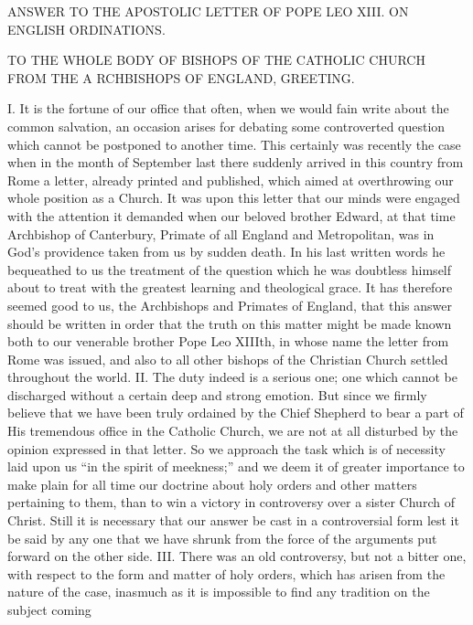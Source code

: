ANSWER TO THE APOSTOLIC LETTER OF POPE LEO XIII. ON ENGLISH ORDINATIONS.

TO THE WHOLE BODY OF BISHOPS OF THE CATHOLIC CHURCH FROM THE A RCHBISHOPS OF ENGLAND, GREETING.

I. It is the fortune of our office that often, when we would fain write about the common salvation, an occasion arises for debating some controverted question which cannot be postponed to another time. This certainly was recently the case when in the month of September last there suddenly arrived in this country from Rome a letter, already printed and published, which aimed at overthrowing our whole position as a Church. It was upon this letter that our minds were engaged with the attention it demanded when our beloved brother Edward, at that time Archbishop of Canterbury, Primate of all England and Metropolitan, was in God’s providence taken from us by sudden death. In his last written words he bequeathed to us the treatment of the question which he was doubtless himself about to treat with the greatest learning and theological grace. It has therefore seemed good to us, the Archbishops and Primates of England, that this answer should be written in order that the truth on this matter might be made known both to our venerable brother Pope Leo XIIIth, in whose name the letter from Rome was issued, and also to all other bishops of the Christian Church settled throughout the world. II. The duty indeed is a serious one; one which cannot be discharged without a certain deep and strong emotion. But since we firmly believe that we have been truly ordained by the Chief Shepherd to bear a part of His tremendous office in the Catholic Church, we are not at all disturbed by the opinion expressed in that letter. So we approach the task which is of necessity laid upon us “in the spirit of meekness;” and we deem it of greater importance to make plain for all time our doctrine about holy orders and other matters pertaining to them, than to win a victory in controversy over a sister Church of Christ. Still it is necessary that our answer be cast in a controversial form lest it be said by any one that we have shrunk from the force of the arguments put forward on the other side. III. There was an old controversy, but not a bitter one, with respect to the form and matter of holy orders, which has arisen from the nature of the case, inasmuch as it is impossible to find any tradition on the subject coming

